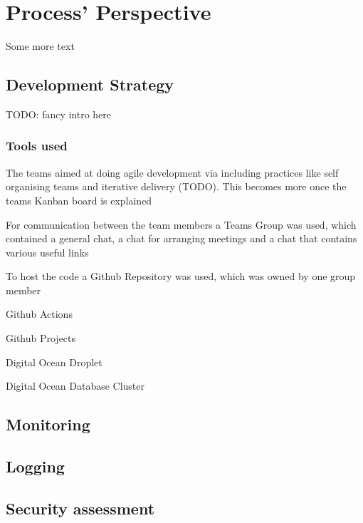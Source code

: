 \documentclass[report/main.tex]{subfiles}
\begin{document}
    \section{Process' Perspective}
    \label{Sec:process_perspective}
        Some more text
        
        \subsection{Development Strategy}
            TODO: fancy intro here
            
            \subsubsection{Tools used}
                The teams aimed at doing agile development via including practices like self organising teams and iterative delivery (TODO). This becomes more once the teams Kanban board is explained
            
                For communication between the team members a Teams Group was used, which contained a general chat, a chat for arranging meetings and a chat that contains various useful links
                
                To host the code a Github Repository was used, which was owned by one group member
                
                Github Actions
                
                Github Projects
                
                Digital Ocean Droplet
                
                Digital Ocean Database Cluster
                
            
        \subsection{Monitoring}
        \subsection{Logging}
        
        \subsection{Security assessment}
            
\end{document}
